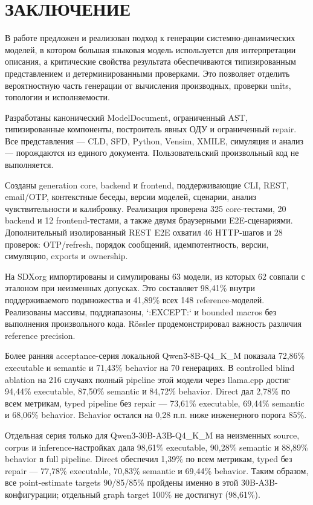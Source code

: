 \chapter*{ЗАКЛЮЧЕНИЕ}

В работе предложен и реализован подход к генерации системно-динамических моделей, в котором большая языковая модель используется для интерпретации описания, а критические свойства результата обеспечиваются типизированным представлением и детерминированными проверками. Это позволяет отделить вероятностную часть генерации от вычисления производных, проверки units, топологии и исполняемости.

Разработаны канонический ModelDocument, ограниченный AST, типизированные компоненты, построитель явных ОДУ и ограниченный repair. Все представления --- CLD, SFD, Python, Vensim, XMILE, симуляция и анализ --- порождаются из единого документа. Пользовательский произвольный код не выполняется.

Созданы generation core, backend и frontend, поддерживающие CLI, REST, email/OTP, контекстные беседы, версии моделей, сценарии, анализ чувствительности и калибровку. Реализация проверена 325 core-тестами, 20 backend и 12 frontend-тестами, а также двумя браузерными E2E-сценариями. Дополнительный изолированный REST E2E охватил 46 HTTP-шагов и 28 проверок: OTP/refresh, порядок сообщений, идемпотентность, версии, симуляцию, exports и ownership.

На SDXorg импортированы и симулированы 63 модели, из которых 62 совпали с эталоном при неизменных допусках. Это составляет 98,41\% внутри поддерживаемого подмножества и 41,89\% всех 148 reference-моделей. Реализованы массивы, поддиапазоны, `:EXCEPT:` и bounded macros без выполнения произвольного кода. Rössler продемонстрировал важность различия reference precision.

Более ранняя acceptance-серия локальной Qwen3-8B-Q4\_K\_M показала 72,86\% executable и semantic и 71,43\% behavior на 70 генерациях. В controlled blind ablation на 216 случаях полный pipeline этой модели через llama.cpp достиг 94,44\% executable, 87,50\% semantic и 84,72\% behavior. Direct дал 2,78\% по всем метрикам, typed pipeline без repair --- 73,61\% executable, 69,44\% semantic и 68,06\% behavior. Behavior остался на 0,28 п.п. ниже инженерного порога 85\%.

Отдельная серия только для Qwen3-30B-A3B-Q4\_K\_M на неизменных source, corpus и inference-настройках дала 98,61\% executable, 90,28\% semantic и 88,89\% behavior в full pipeline. Direct обеспечил 1,39\% по всем метрикам, typed без repair --- 77,78\% executable, 70,83\% semantic и 69,44\% behavior. Таким образом, все point-estimate targets 90/85/85\% пройдены именно в этой 30B-A3B-конфигурации; отдельный graph target 100\% не достигнут (98,61\%).

